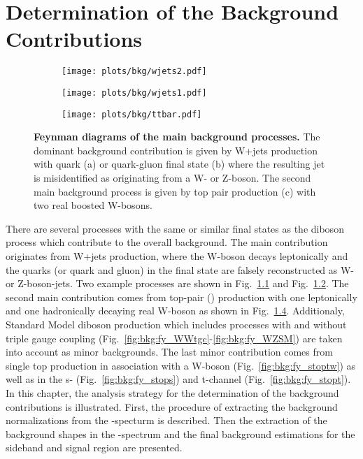 \chapter{Determination of the Background Contributions}
\label{chap:DeterminationoftheBackgroundContributions}
\begin{figure}[H!b]
	\centering
	\begin{subfigure}{0.4\textwidth}
		\texttt{[image: plots/bkg/wjets2.pdf]}
		\caption{}
		\label{fig:bkg:fy_wjets1}
	\end{subfigure}
	\begin{subfigure}{0.4\textwidth}
		\texttt{[image: plots/bkg/wjets1.pdf]}
		\caption{}
		\label{fig:bkg:fy_wjets2}
	\end{subfigure}
	\begin{subfigure}{0.4\textwidth}
		\texttt{[image: plots/bkg/ttbar.pdf]}
		\caption{}
		\label{fig:bkg:fy_ttbar}
	\end{subfigure}
	\caption[Feynman diagrams of the main background processes.]{\textbf{Feynman diagrams of the main background processes.} The dominant background contribution is given by W+jets production with quark (a) or quark-gluon final state (b) where the resulting jet is misidentified as originating from a W- or Z-boson. The second main background process is given by top pair production (c) with two real boosted W-bosons.}
\end{figure}
There are several processes with the same or similar final states as the diboson process which contribute to the overall background. The main contribution originates from W+jets production, where the W-boson decays leptonically and the quarks (or quark and gluon) in the final state are falsely reconstructed as W- or Z-boson-jets. Two example processes are shown in Fig.~\ref{fig:bkg:fy_wjets1} and Fig.~\ref{fig:bkg:fy_wjets2}. The second main contribution comes from top-pair (\ttbar) production with one leptonically and one hadronically decaying real W-boson as shown in Fig.~\ref{fig:bkg:fy_ttbar}. Additionaly, Standard Model diboson production which includes processes with and without triple gauge coupling (Fig.~\ref{fig:bkg:fy_WWtgc}-\ref{fig:bkg:fy_WZSM}) are taken into account as minor backgrounds. The last minor contribution comes from single top production in association with a W-boson (Fig.~\ref{fig:bkg:fy_stoptw}) as well as in the s- (Fig.~\ref{fig:bkg:fy_stops}) and t-channel (Fig.~\ref{fig:bkg:fy_stopt}).\\
In this chapter, the analysis strategy for the determination of the background contributions is illustrated.  First, the procedure of extracting the background normalizations from the \Mpr -specturm is described. Then the extraction of the background shapes in the \MWV -spectrum and the final background estimations for the sideband and signal region are presented.

